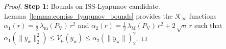 \begin{proof}

    \textbf{Step 1:} Bounds on ISS-Lyapunov candidate.\\
    Lemma~\ref{lemma:con:iss_lyapunov_bounds} provides the $\mathcal{K_\infty}$ functions 
    $\alpha_1(r)=\frac{1}{2} \, \lambda_\mathrm{m}(P_\mathrm{V})  \, r^2$ and $\alpha_2(r)=\frac{1}{2} \, \lambda_\mathrm{M}(P_\mathrm{V}) \, r^2 + 2 \, \sqrt{n} \, r$ such that $ \alpha_1(\lVert \tilde{y}_\mathrm{w} \rVert_2^2) \leq V_\mu(\tilde{y}_\mathrm{w}) \leq \alpha_2(\lVert \tilde{y}_\mathrm{w} \rVert)_2^2$.
    

\end{proof}
